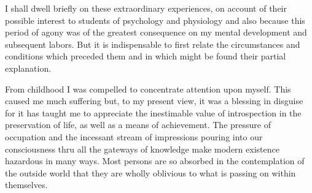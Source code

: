 \documentclass[a4paper,12pt,english,twoside,openright]{memoir}
\begin{document}
	
	
	\lettrine[lines=3]{I}{} shall dwell briefly on these extraordinary experiences, on account of their possible interest to 
	students of psychology and physiology and also because this period of agony was of the greatest 
	consequence on my mental development and subsequent labors.  But it is indispensable to first 
	relate the circumstances and conditions which preceded them and in which might be found their 
	partial explanation.  
	
	From childhood I was compelled to concentrate attention upon myself.  This caused me much 
	suffering but, to my present view, it was a blessing in disguise for it has taught me to appreciate 
	the inestimable value of introspection in the preservation of life, as well as a means of 
	achievement.  The pressure of occupation and the incessant stream of impressions pouring into 
	our consciousness thru all the gateways of knowledge make modern existence hazardous in 
	many ways.  Most persons are so absorbed in the contemplation of the outside world that they 
	are wholly oblivious to what is passing on within themselves.  
	
\end{document}
